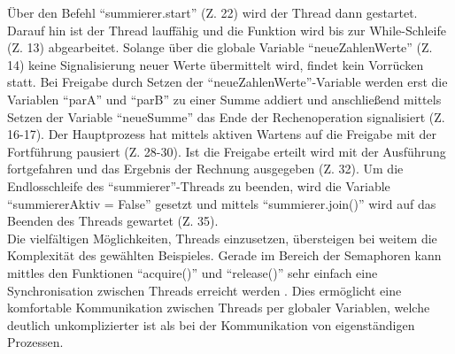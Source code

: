 Über den Befehl ``summierer.start'' (Z. 22) wird der Thread dann gestartet. Darauf hin ist der Thread lauffähig und die Funktion wird bis zur While-Schleife (Z. 13) abgearbeitet. Solange über die globale Variable ``neueZahlenWerte'' (Z. 14) keine Signalisierung neuer Werte übermittelt wird, findet kein Vorrücken statt. Bei Freigabe durch Setzen der ``neueZahlenWerte''-Variable werden erst die Variablen ``parA'' und ``parB'' zu einer Summe addiert und anschließend mittels Setzen der Variable ``neueSumme'' das Ende der Rechenoperation signalisiert (Z. 16-17). Der Hauptprozess hat mittels aktiven Wartens auf die Freigabe mit der Fortführung pausiert (Z. 28-30). Ist die Freigabe erteilt wird mit der Ausführung fortgefahren und das Ergebnis der Rechnung ausgegeben (Z. 32). Um die Endlosschleife des ``summierer''-Threads zu beenden, wird die Variable ``summiererAktiv = False'' gesetzt und mittels ``summierer.join()'' wird auf das Beenden des Threads gewartet (Z. 35).\\
Die vielfältigen Möglichkeiten, Threads einzusetzen, übersteigen bei weitem die Komplexität des gewählten Beispieles. Gerade im Bereich der Semaphoren kann mittles den Funktionen ``acquire()'' und ``release()'' sehr einfach eine Synchronisation zwischen Threads erreicht werden \cite{PythonSoftwareFoundation.}. Dies ermöglicht eine komfortable Kommunikation zwischen Threads per globaler Variablen, welche deutlich unkomplizierter ist als bei der Kommunikation von eigenständigen Prozessen.
\newpage
